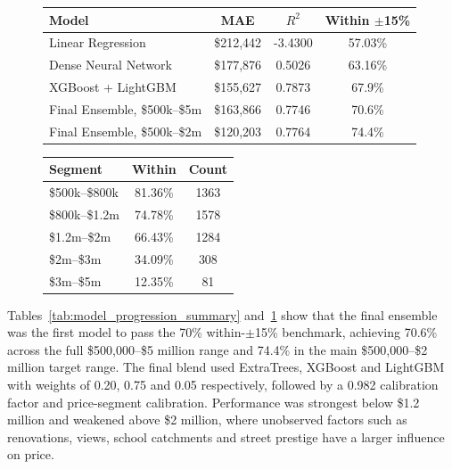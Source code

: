 \documentclass[a4paper,12pt]{article}
\begin{document}
\begin{figure}[H]
\centering

\begin{minipage}[t]{0.60\textwidth}
\centering
\scriptsize
{}
\label{tab:model_progression_summary}
\begin{tabular}{@{}lccc@{}}
\toprule
\textbf{Model} & \textbf{MAE} & \textbf{$R^2$} & \textbf{Within $\pm$15\%} \\
\midrule
Linear Regression & \$212,442 & -3.4300 & 57.03\% \\
Dense Neural Network & \$177,876 & 0.5026 & 63.16\% \\
XGBoost + LightGBM & \$155,627 & 0.7873 & 67.9\% \\
Final Ensemble, \$500k--\$5m & \$163,866 & 0.7746 & 70.6\% \\
Final Ensemble, \$500k--\$2m & \$120,203 & 0.7764 & 74.4\% \\
\bottomrule
\end{tabular}
\end{minipage}
\hfill
\begin{minipage}[t]{0.36\textwidth}
\centering
\scriptsize
{}
\label{tab:final_price_segment_results}
\begin{tabular}{@{}lcc@{}}
\toprule
\textbf{Segment} & \textbf{Within} & \textbf{Count} \\
\midrule
\$500k--\$800k & 81.36\% & 1363 \\
\$800k--\$1.2m & 74.78\% & 1578 \\
\$1.2m--\$2m & 66.43\% & 1284 \\
\$2m--\$3m & 34.09\% & 308 \\
\$3m--\$5m & 12.35\% & 81 \\
\bottomrule
\end{tabular}
\end{minipage}

\end{figure}

Tables~\ref{tab:model_progression_summary} and~\ref{tab:final_price_segment_results} show that the final ensemble was the first model to pass the 70\% within-$\pm$15\% benchmark, achieving 70.6\% across the full \$500,000--\$5 million range and 74.4\% in the main \$500,000--\$2 million target range. The final blend used ExtraTrees, XGBoost and LightGBM with weights of 0.20, 0.75 and 0.05 respectively, followed by a 0.982 calibration factor and price-segment calibration. Performance was strongest below \$1.2 million and weakened above \$2 million, where unobserved factors such as renovations, views, school catchments and street prestige have a larger influence on price.
\end{document}
